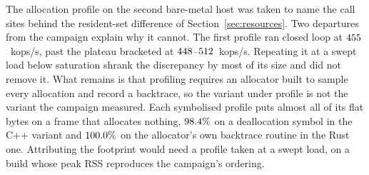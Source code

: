 \documentclass[english,oneside,a4paper,censored,csm,software-track-2020]{HYthesisML}
\begin{document}
\begin{appendices}
The allocation profile on the second bare-metal host was taken to name the call sites behind
the resident-set difference of Section~\ref{sec:resources}. Two departures from the campaign
explain why it cannot. The first profile ran closed loop at $455$~kops/s, past the
plateau bracketed at $448$--$512$~kops/s. Repeating it at a swept load below saturation
shrank the discrepancy by most of its size and did not remove it. What remains is that
profiling requires an allocator built to sample every allocation and record a backtrace, so the
variant under profile is not the variant the campaign measured. Each symbolised profile puts almost all
of its flat bytes on a frame that allocates nothing, $98.4\%$ on a deallocation
symbol in the C++ variant and $100.0\%$ on the allocator's own backtrace routine in the
Rust one. Attributing the footprint would need a profile taken at a swept load, on a build
whose peak RSS reproduces the campaign's ordering.

\end{appendices}

\clearpage
\end{document}
